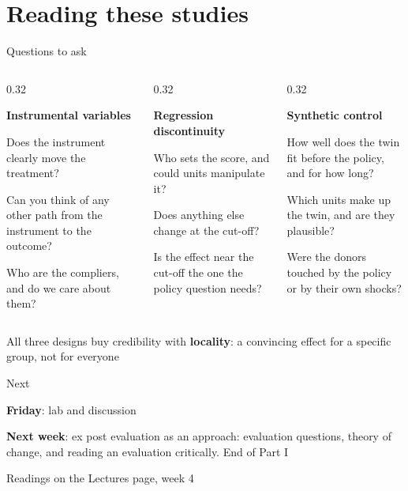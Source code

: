 \documentclass[aspectratio=169,xcolor=table]{beamer}
\begin{document}
\section{Reading these studies}

\begin{frame}{Questions to ask}
\small
\footnotesize
\begin{columns}[T]
\begin{column}{0.32\textwidth}\raggedright
\textbf{Instrumental variables}
\be
  \item Does the instrument clearly move the treatment?
  \item Can you think of any other path from the instrument to the outcome?
  \item Who are the compliers, and do we care about them?
\ee
\end{column}
\begin{column}{0.32\textwidth}\raggedright
\textbf{Regression discontinuity}
\be
  \item Who sets the score, and could units manipulate it?
  \item Does anything else change at the cut-off?
  \item Is the effect near the cut-off the one the policy question needs?
\ee
\end{column}
\begin{column}{0.32\textwidth}\raggedright
\textbf{Synthetic control}
\be
  \item How well does the twin fit before the policy, and for how long?
  \item Which units make up the twin, and are they plausible?
  \item Were the donors touched by the policy or by their own shocks?
\ee
\end{column}
\end{columns}
\vspace{0.2cm}
\begin{block}{}
\centering All three designs buy credibility with \textbf{locality}: a convincing effect for a specific group, not for everyone
\end{block}
\end{frame}

\begin{frame}{Next}
\small
\bi
  \item \textbf{Friday}: lab and discussion
  \item \textbf{Next week}: ex post evaluation as an approach: evaluation questions, theory of change, and reading an evaluation critically. End of Part I
  \item Readings on the Lectures page, week 4
\ei
\end{frame}
\end{document}
